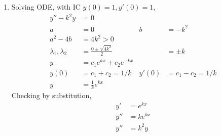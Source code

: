 \begin{enumerate}
    \item Solving ODE, with IC $ y(0) = 1 , y'(0) = 1$,
          \begin{align}
              y'' - k^{2}y             & = 0                                                             \\
              a                        & = 0                             & b     & = -k^{2}              \\
              a^{2} - 4b               & = 4k^{2} > 0                                                    \\
              \lambda_{1}, \lambda_{2} & = \frac{0 \pm \sqrt{4k^{2}}}{2} &       & = \pm k               \\
              y                        & = c_{1}e^{kx} + c_{2}e^{-kx}                                    \\
              y(0)                     & = c_{1} + c_{2} = 1/k           & y'(0) & = c_{1} - c_{2} = 1/k \\
              y                        & = \frac{1}{k}e^{kx}
          \end{align}
          Checking by substitution,
          \begin{align}
              y'  & = e^{kx}  \\
              y'' & = ke^{kx} \\
              y'' & = k^{2}y
          \end{align}


\end{enumerate}
